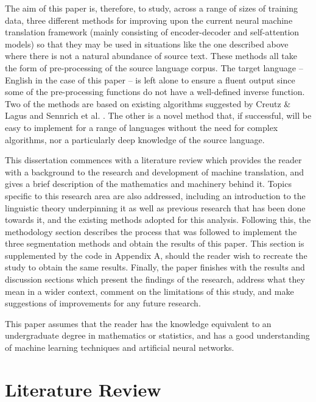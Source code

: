 \documentclass[11pt]{article}
\begin{document}
\bigskip

The aim of this paper is, therefore, to study, across a range of sizes of training data, three different methods for improving upon the current neural machine translation framework (mainly consisting of encoder-decoder and self-attention models) so that they may be used in situations like the one described above where there is not a natural abundance of source text. These methods all take the form of pre-processing of the source language corpus. The target language -- English in the case of this paper -- is left alone to ensure a fluent output since some of the pre-processing functions do not have a well-defined inverse function. Two of the methods are based on existing algorithms suggested by Creutz \& Lagus \citeyearpar{creutz-lagus-2002-unsupervised} and Sennrich et al. \citeyearpar{sennrich-etal-2016-neural}. The other is a novel method that, if successful, will be easy to implement for a range of languages without the need for complex algorithms, nor a particularly deep knowledge of the source language.

\bigskip

This dissertation commences with a literature review which provides the reader with a background to the research and development of machine translation, and gives a brief description of the mathematics and machinery behind it. Topics specific to this research area are also addressed, including an introduction to the linguistic theory underpinning it as well as previous research that has been done towards it, and the existing methods adopted for this analysis. Following this, the methodology section describes the process that was followed to implement the three segmentation methods and obtain the results of this paper. This section is supplemented by the code in Appendix A, should the reader wish to recreate the study to obtain the same results. Finally, the paper finishes with the results and discussion sections which present the findings of the research, address what they mean in a wider context, comment on the limitations of this study, and make suggestions of improvements for any future research.

\bigskip

This paper assumes that the reader has the knowledge equivalent to an undergraduate degree in mathematics or statistics, and has a good understanding of machine learning techniques and artificial neural networks.

\section{Literature Review}
\end{document}
